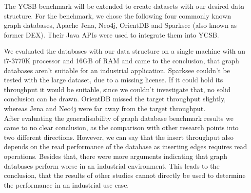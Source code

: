 The YCSB benchmark will be extended to create datasets with our desired data structure.
For the benchmark,
we chose the following four commonly known graph databases, Apache Jena, Neo4j, OrientDB and Sparksee (also known as former DEX).
Their Java APIs were used to integrate them into YCSB.

We evaluated the databases with our data structure on a single machine with an i7-3770K processor and 16GB of RAM and came to the conclusion,
that graph databases aren't suitable for an industrial application.
Sparksee couldn't be tested with the large dataset,
due to a missing license.
If it could hold its throughput it would be suitable,
since we couldn't investigate that,
no solid conclusion can be drawn.
OrientDB missed the target throughput slightly,
whereas Jena and Neo4j were far away from the target throughput.\\
After evaluating the generalisability of graph database benchmark results we came to no clear conclusion,
as the comparison with other research points into two different directions.
However,
we can say that the insert throughput also depends on the read performance of the database as inserting edges requires read operations.
Besides that,
there were more arguments indicating that graph databases perform worse in an industrial environment.
This leads to the conclusion,
that the results of other studies cannot directly be used to determine the performance in an industrial use case.

\cleardoublepage
